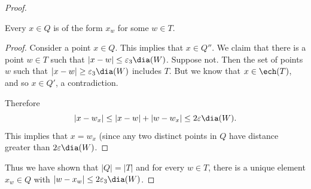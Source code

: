 \begin{proof}
\begin{claim}
\label{cl:final}
Every $x \in Q$ is of the form $x_w$ for some $w \in T$. 
\end{claim}
\begin{proof}
Consider a point $x \in Q$. This implies that $x \in Q''$. We claim that there is a point $w \in T$ such that $|x-w| \leq \varepsilon_3 \dia(W)$. Suppose not. Then the set of points $w$ such that $|x-w| \geq \varepsilon_3 \dia(W)$ includes $T$. But we know that $x \in \ech(T)$, and so $x \in Q'$, a contradiction. 

Therefore $$|x - w_x| \leq |x- w| + |w-w_x| \leq  2\varepsilon \dia(W). $$
This implies that $x=w_x$ (since any two distinct points in $Q$ have distance greater than $2\varepsilon \dia(W)$. 
\end{proof}

Thus we have shown that $|Q|=|T|$ and for every $w \in T$, there is a unique element $x_w \in Q$ with $|w-x_w| \leq 2 \varepsilon_3 \dia(W)$.
\end{proof}


